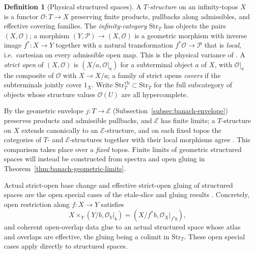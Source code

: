 \documentclass[12pt]{amsart}
\theoremstyle{definition}
\newtheorem{defn}[thm]{Definition}
\theoremstyle{remark}
\numberwithin{equation}{section}
\newcommand{\E}{\mathcal E}
\begin{document}
\begin{defn}[Physical structured spaces]
\label{defn:banach-structured}
A \emph{$T$-structure} on an infinity-topos $X$ is a functor
$\mathcal O\colon T\to X$ preserving finite products, pullbacks
along admissibles, and effective covering families. The
\emph{infinity-category} $\mathrm{Str}_T$ has objects the pairs
$(X,\mathcal O)$; a morphism $(Y,\mathcal P)\to(X,\mathcal O)$ is a
geometric morphism with inverse image $f^{*}\colon X\to Y$ together
with a natural transformation $f^{*}\mathcal O\to\mathcal P$ that is
\emph{local}, i.e.\ cartesian on every admissible open map. This is
the physical variance of
\cite[Definitions~3.1.4 and~3.1.9,
pp.~82--85]{LurieDAGV2009}.
A \emph{strict open} of $(X,\mathcal O)$ is
$(X/a,\mathcal O|_a)$ for a subterminal object $a$ of $X$, with
$\mathcal O|_a$ the composite of $\mathcal O$ with $X\to X/a$; a
family of strict opens \emph{covers} if the subterminals jointly
cover $1_X$. Write $\mathrm{Str}_T^{\mathrm{vh}}\subset\mathrm{Str}_T$
for the full subcategory of objects whose structure values
$\mathcal O(U)$ are all hypercomplete.
\end{defn}

By \cite[Definition~3.4.1 and Lemma~3.4.3,
pp.~96--97]{LurieDAGV2009} the geometric envelope $j\colon T\to\E$
(Subsection~\ref{subsec:banach-envelope}) preserves products and
admissible pullbacks, and $\E$ has finite limits; a $T$-structure on
$X$ extends canonically to an $\E$-structure, and on each fixed
topos the categories of $T$- and $\E$-structures together with their
local morphisms agree \cite[Proposition~3.4.5,
pp.~97--98]{LurieDAGV2009}. This comparison takes place over a
\emph{fixed} topos. Finite limits of geometric structured spaces
will instead be constructed from spectra and open gluing in
Theorem~\ref{thm:banach-geometric-limits}.

Actual strict-open base change and effective strict-open gluing of
structured spaces are the open special cases of the etale-slice and
gluing results
\cite[Proposition~2.3.5(3)--(5), p.~51 (opening on
p.~50), and Remark~2.3.20, p.~57]{LurieDAGV2009}. Concretely, open
restriction along $f\colon X\to Y$ satisfies
\begin{equation}
\label{eq:banach-open-restriction}
 X\times_Y (Y/b,\mathcal O_Y|_b)
   =(X/f^{*}b,\mathcal O_X|_{f^{*}b}),
\end{equation}
and coherent open-overlap data glue to an actual structured space
whose atlas and overlaps are effective, the gluing being a colimit
in $\mathrm{Str}_T$. These open special cases apply directly
to structured spaces.
\end{document}
